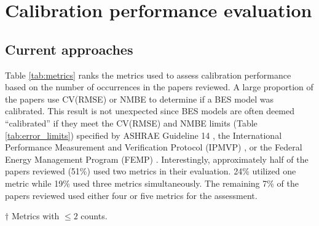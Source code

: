 \documentclass[review]{elsarticle}
\begin{document}
\section{Calibration performance evaluation} \label{sec:calib_performance}

\subsection{Current approaches} \label{sec:performance_current}

Table \ref{tab:metrics} ranks the metrics used to assess calibration performance based on the number of occurrences in the papers reviewed. A large proportion of the papers use CV(RMSE) or NMBE to determine if a BES model was calibrated. This result is not unexpected since BES models are often deemed ``calibrated'' if they meet the CV(RMSE) and NMBE limits (Table \ref{tab:error_limits}) specified by ASHRAE Guideline 14 \cite{ashrae2014guideline}, the International Performance Measurement and Verification Protocol (IPMVP) \cite{evo2012international}, or the Federal Energy Management Program (FEMP) \cite{femp2015guidelines}. Interestingly, approximately half of the papers reviewed (51\%) used two metrics in their evaluation. 24\% utilized one metric while 19\% used three metrics simultaneously. The remaining 7\% of the papers reviewed used either four or five metrics for the assessment.

\begin{table}[h!]
\caption{Metrics used for the evaluation of calibration performance. Each paper may employ more than one metric when assessing calibration performance. Therefore, the cumulative sum for the column ``No. of Papers'' is greater than the total number of papers reviewed (N=107).} 
\label{tab:metrics}
\centering
{}
\raggedright \tiny $\dagger$ Metrics with $\leq 2$ counts. 
\end{table}
\end{document}
